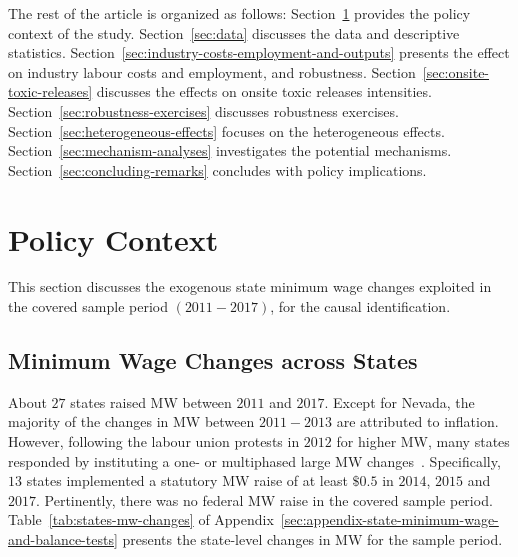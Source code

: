 \documentclass[authoryear, preprint, twocolumn, 1p]{elsarticle}
\begin{document}
    The rest of the article is organized as follows: Section~\ref{sec:policy-context} provides the policy context of the study. Section~\ref{sec:data} discusses the data and descriptive statistics. Section~\ref{sec:industry-costs-employment-and-outputs} presents the effect on industry labour costs and employment, and robustness. Section~\ref{sec:onsite-toxic-releases} discusses the effects on onsite toxic releases intensities. Section~\ref{sec:robustness-exercises} discusses robustness exercises. Section~\ref{sec:heterogeneous-effects} focuses on the heterogeneous effects. Section~\ref{sec:mechanism-analyses} investigates the potential mechanisms. Section~\ref{sec:concluding-remarks} concludes with policy implications.


    \section{Policy Context}\label{sec:policy-context}
    This section discusses the exogenous state minimum wage changes exploited in the covered sample period $(2011-2017)$, for the causal identification.

    \subsection{Minimum Wage Changes across States}\label{subsec:minimum-wage-changes-across-states}
    About $27$ states raised MW between $2011$ and $2017$. Except for Nevada, the majority of the changes in MW between $2011-2013$ are attributed to inflation. However, following the labour union protests in $2012$ for higher MW, many states responded by instituting a one- or multiphased large MW changes~\citep{lathrop2021raises}. Specifically, $13$ states implemented a statutory MW raise of at least $\$0.5$ in $2014$, $2015$ and $2017$. Pertinently, there was no federal MW raise in the covered sample period. Table~\ref{tab:states-mw-changes} of Appendix~\ref{sec:appendix-state-minimum-wage-and-balance-tests} presents the state-level changes in MW for the sample period.
\end{document}
